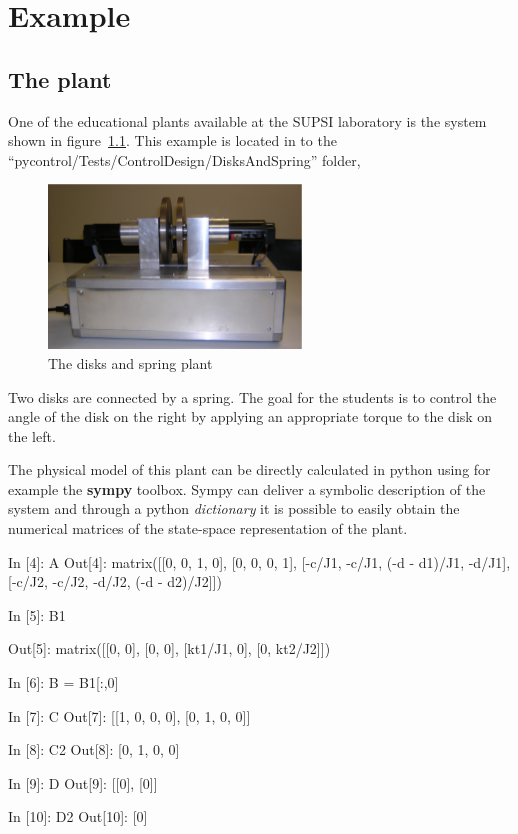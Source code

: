 \chapter{Example}
\section{The plant}

One of the educational plants available at the SUPSI laboratory is the system 
shown in figure~\ref{F20}. This example is located in to the 
``pycontrol/Tests/ControlDesign/DisksAndSpring'' folder,

\begin{figure}[htbp]	%
\centering
\includegraphics[width=0.6\textwidth]{eps/disks.eps}
\caption{The disks and spring plant}
\label{F20}
\end{figure}

Two disks are connected by a spring. The goal for the students is to control 
the angle of the disk on the right by applying an appropriate torque to the 
disk on the left.

The physical model of this plant can be directly calculated in python using for 
example the \textbf{sympy} toolbox.
Sympy can deliver a symbolic description of the system and through a python 
\textit{dictionary} it is possible to easily obtain the numerical matrices of 
the state-space representation of the plant.

\begin{code}

In [4]: A
Out[4]: 
matrix([[0, 0, 1, 0],
        [0, 0, 0, 1],
        [-c/J1, -c/J1, (-d - d1)/J1, -d/J1],
        [-c/J2, -c/J2, -d/J2, (-d - d2)/J2]])

In [5]: B1

Out[5]: 
matrix([[0, 0],
        [0, 0],
        [kt1/J1, 0],
        [0, kt2/J2]])

In [6]: B = B1[:,0]
        
In [7]: C
Out[7]: [[1, 0, 0, 0], [0, 1, 0, 0]]

In [8]: C2
Out[8]: [0, 1, 0, 0]

In [9]: D
Out[9]: [[0], [0]]

In [10]: D2
Out[10]: [0]
\end{code}

